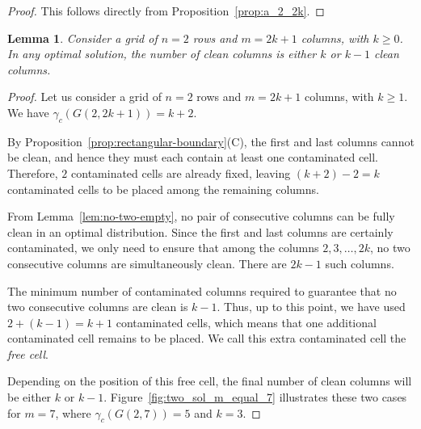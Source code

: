 \documentclass[letterpaper,12pt]{article}
\newtheorem{lemma}{Lemma}
\begin{document}
\begin{proof}
    This follows directly from Proposition~\ref{prop:a_2_2k}.\qedhere
\end{proof}




\begin{lemma}\label{lem:nbr_clean_cols_odd_m}
    Consider a grid of $n=2$ rows and $m=2k+1$ columns, with $k \geq 0$.  
    In any optimal solution, the number of clean columns is   either $k$  or $k-1$ clean columns. 
\end{lemma}

\begin{proof}
    Let us consider a grid of $n=2$ rows and $m=2k+1$ columns, with $k \geq 1$.  
    We have $\gamma_c(G(2,2k+1)) = k+2$.
 

    By Proposition~\ref{prop:rectangular-boundary}(C), the first and last columns cannot be clean, and hence they must each contain at least one contaminated cell. Therefore, $2$ contaminated cells are already fixed, leaving
    $(k+2) - 2 = k$ contaminated cells to be placed among the remaining columns.

    From Lemma~\ref{lem:no-two-empty}, no pair of consecutive columns can be fully clean in an optimal distribution.  
    Since the first and last columns are certainly contaminated, we only need to ensure that among the  columns $2,3,\dots,2k$, no two consecutive columns are simultaneously clean.  
    There are $2k-1$ such  columns.  

    The minimum number of contaminated columns required to guarantee that no two consecutive  columns are clean is $k-1$.  
    Thus, up to this point, we have used  $2 + (k-1) = k+1$ contaminated cells, which means that one additional contaminated cell remains to be placed. We call this extra contaminated cell the \emph{free cell}.  

    Depending on the position of this free cell, the final number of clean columns will be either $k$ or $k-1$.  Figure~\ref{fig:two_sol_m_equal_7} illustrates these two cases for $m=7$, where $\gamma_c(G(2,7)) = 5$ and $k=3$.\qedhere
\end{proof}
\end{document}
